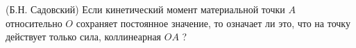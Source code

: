 (Б.Н. Садовский)
Если кинетический момент материальной точки $A$ относительно $O$
сохраняет постоянное значение, то означает ли это, что на точку
действует только сила, коллинеарная $OA$ ?
